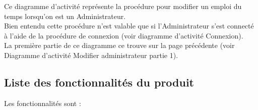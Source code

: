 \documentclass[a4paper, 11pt]{article}
\begin{document}
        Ce diagramme d'activité représente la procédure pour modifier un emploi du temps lorsqu'on est un Administrateur.\\
        Bien entendu cette procédure n'est valable que si l'Administrateur s'est connecté à l'aide de la procédure de connexion (voir diagramme d'activité Connexion).\\
        La première partie de ce diagramme ce trouve sur la page précédente (voir Diagramme d'activité Modifier administrateur partie 1).
	\clearpage
        \subsection{ Liste des fonctionnalités du produit}
        Les fonctionnalités sont :
\end{document}
